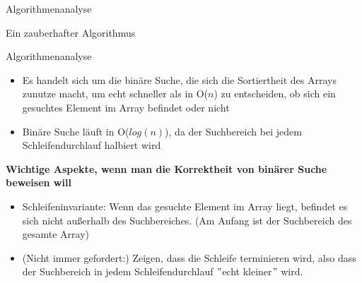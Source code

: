 

\begin{frame}{Algorithmenanalyse}
	\begin{exampleblock}{Ein zauberhafter Algorithmus}
		\begin{algorithm}[H]
			\DontPrintSemicolon
			\footnotesize
		\end{algorithm}
	\end{exampleblock}
\end{frame}


\begin{frame}{Algorithmenanalyse}
	\begin{itemize}
		\item Es handelt sich um die binäre Suche, die sich die Sortiertheit des Arrays zunutze macht, um echt schneller als in O($n$) zu entscheiden, ob sich ein gesuchtes Element im Array befindet oder nicht
		\pause
		\item Binäre Suche läuft in O($log(n)$), da der Suchbereich bei jedem Schleifendurchlauf halbiert wird
		\pause
	\end{itemize}
	\textbf{Wichtige Aspekte, wenn man die Korrektheit von binärer Suche beweisen will}
	\begin{itemize}
		\pause
		\item Schleifeninvariante: Wenn das gesuchte Element im Array liegt, befindet es sich nicht außerhalb des Suchbereiches. (Am Anfang ist der Suchbereich des gesamte Array)
		\pause
		\item (Nicht immer gefordert:) Zeigen, dass die Schleife terminieren wird, also dass der Suchbereich in jedem Schleifendurchlauf $"$echt kleiner$"$ wird.
	\end{itemize}
\end{frame}

